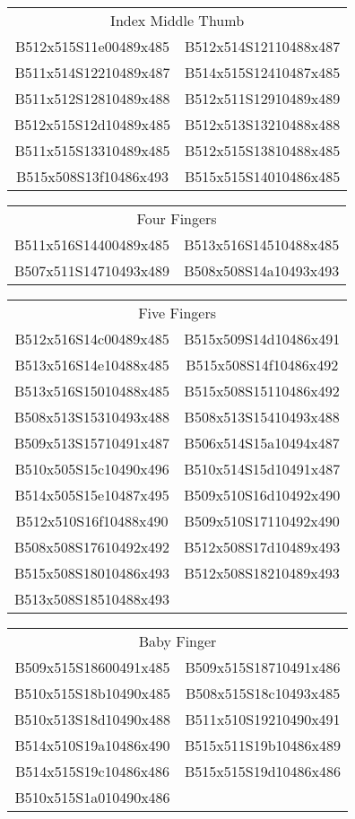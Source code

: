 \documentclass{article}
\begin{document}
\begin{multicols}{3}
\noindent
\begin{tabular}{cc}
\multicolumn{2}{c}{Index Middle Thumb}\\
B512x515S11e00489x485&B512x514S12110488x487\\
B511x514S12210489x487&B514x515S12410487x485\\
B511x512S12810489x488&B512x511S12910489x489\\
B512x515S12d10489x485&B512x513S13210488x488\\
B511x515S13310489x485&B512x515S13810488x485\\
B515x508S13f10486x493&B515x515S14010486x485\\
\end{tabular}

\noindent
\begin{tabular}{cc}
\multicolumn{2}{c}{Four Fingers}\\
B511x516S14400489x485&B513x516S14510488x485\\
B507x511S14710493x489&B508x508S14a10493x493\\
\end{tabular}

\noindent
\begin{tabular}{cc}
\multicolumn{2}{c}{Five Fingers}\\
B512x516S14c00489x485&B515x509S14d10486x491\\
B513x516S14e10488x485&B515x508S14f10486x492\\
B513x516S15010488x485&B515x508S15110486x492\\
B508x513S15310493x488&B508x513S15410493x488\\
B509x513S15710491x487&B506x514S15a10494x487\\
B510x505S15c10490x496&B510x514S15d10491x487\\
B514x505S15e10487x495&B509x510S16d10492x490\\
B512x510S16f10488x490&B509x510S17110492x490\\
B508x508S17610492x492&B512x508S17d10489x493\\
B515x508S18010486x493&B512x508S18210489x493\\
B513x508S18510488x493\\
\end{tabular}

\noindent
\begin{tabular}{cc}
\multicolumn{2}{c}{Baby Finger}\\
B509x515S18600491x485&B509x515S18710491x486\\
B510x515S18b10490x485&B508x515S18c10493x485\\
B510x513S18d10490x488&B511x510S19210490x491\\
B514x510S19a10486x490&B515x511S19b10486x489\\
B514x515S19c10486x486&B515x515S19d10486x486\\
B510x515S1a010490x486\\
\end{tabular}


\end{multicols}
\end{document}
